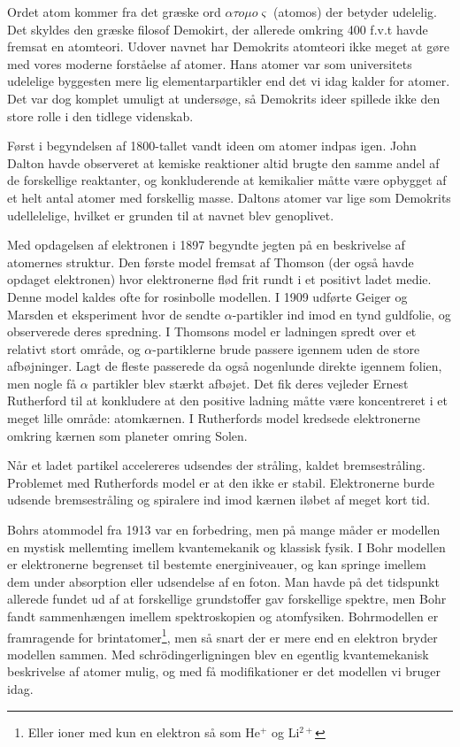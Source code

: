 \documentclass[../../Atom-ogMolekylefysik.tex]{subfiles}
\begin{document}
Ordet atom kommer fra det græske ord $\alpha \tau o \mu o \varsigma$ (atomos) der betyder udelelig. Det skyldes den græske filosof Demokirt, der allerede omkring 400 f.v.t havde fremsat en atomteori. Udover navnet har Demokrits atomteori ikke meget at gøre med vores moderne forståelse af atomer. Hans atomer var som universitets udelelige byggesten mere lig elementarpartikler end det vi idag kalder for atomer. 
Det var dog komplet umuligt at undersøge, så Demokrits ideer spillede ikke den store rolle i den tidlege videnskab.

Først i begyndelsen af 1800-tallet vandt ideen om atomer indpas igen. John Dalton havde observeret at kemiske reaktioner altid brugte den samme andel af de forskellige reaktanter, og konkluderende at kemikalier måtte være opbygget af et helt antal atomer med forskellig masse. Daltons atomer var lige som Demokrits udellelelige, hvilket er grunden til at navnet blev genoplivet. 

Med opdagelsen af elektronen i 1897 begyndte jegten på en beskrivelse af atomernes struktur. Den første model fremsat af Thomson (der også havde opdaget elektronen) hvor elektronerne flød frit rundt i et positivt ladet medie. Denne model kaldes ofte for rosinbolle modellen. 
I 1909 udførte Geiger og Marsden et eksperiment hvor de sendte $\alpha$-partikler ind imod en tynd guldfolie, og observerede deres spredning. I Thomsons model er ladningen spredt over et relativt stort område, og $\alpha$-partiklerne brude passere igennem uden de store afbøjninger. Lagt de fleste passerede da også nogenlunde direkte igennem folien, men nogle få $\alpha$ partikler blev stærkt afbøjet. Det fik deres vejleder Ernest Rutherford til at konkludere at den positive ladning måtte være koncentreret i et meget lille område: atomkærnen. I Rutherfords model kredsede elektronerne omkring kærnen som planeter omring Solen. 

Når et ladet partikel accelereres udsendes der stråling, kaldet bremsestråling. Problemet med Rutherfords model er at den ikke er stabil. Elektronerne burde udsende bremsestråling og spiralere ind imod kærnen iløbet af meget kort tid. 

Bohrs atommodel fra 1913 var en forbedring, men på mange måder er modellen en mystisk mellemting imellem kvantemekanik og klassisk fysik. I Bohr modellen er elektronerne begrenset til bestemte energiniveauer, og kan springe imellem dem under absorption eller udsendelse af en foton. Man havde på det tidspunkt allerede fundet ud af at forskellige grundstoffer gav forskellige spektre, men Bohr fandt sammenhængen imellem spektroskopien og atomfysiken.
Bohrmodellen er framragende for brintatomer\footnote{Eller ioner med kun en elektron så som He$^+$ og Li$^{2+}$}, men så snart der er mere end en elektron bryder modellen sammen. Med schrödingerligningen blev en egentlig kvantemekanisk beskrivelse af atomer mulig, og med få modifikationer er det modellen vi bruger idag.
\end{document}
